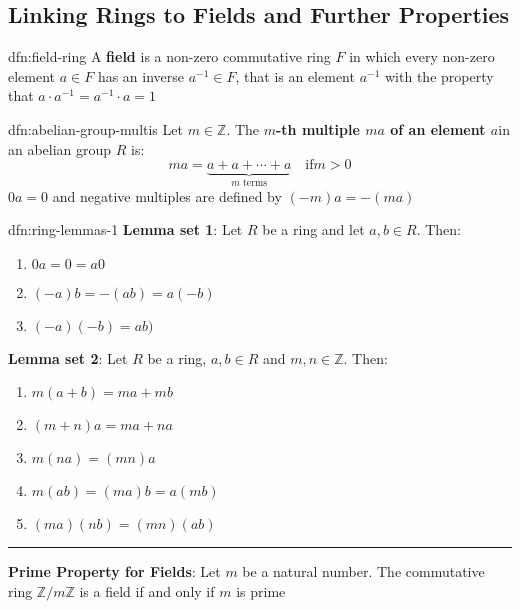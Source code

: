 \documentclass[landscape, 8pt]{extarticle}
\begin{document}
\begin{multicols}{3}
\subsection{Linking Rings to Fields and Further Properties}

\begin{dfn}{dfn:field-ring}{}
    A \textbf{field} is a non-zero commutative ring $F$ in which every non-zero element $a\in F$ has an inverse $a^{-1}\in F$, that is an element $a^{-1}$ with the property that $a \cdot a^{-1} = a^{-1} \cdot a = 1$
\end{dfn}



\begin{dfn}{dfn:abelian-group-multis}{}
    Let $m\in \mathbb{Z}$. The \textbf{$m$-th multiple $ma$ of an element $a$}in an abelian group $R$ is:
    \[ma = \underbrace{a + a + \cdots + a}_{\text{$m$ terms}} \quad \text{if} m > 0\]
    $0a = 0$ and negative multiples are defined by $(-m)a = -(ma)$
\end{dfn}

\newpage


\begin{thm}{dfn:ring-lemmas-1}{}
    \textbf{Lemma set 1}: Let $R$ be a ring and let $a,b\in R$. Then:
    \begin{enumerate}
        \setlength\itemsep{0em}
        \item $0a = 0 = a 0$
        \item $(-a)b = -(ab) = a(-b)$
        \item $(-a)(-b) = ab)$
    \end{enumerate}

    \textbf{Lemma set 2}: Let $R$ be a ring, $a,b\in R$ and $m,n\in \mathbb{Z}$. Then:
    \begin{enumerate}
        \setlength\itemsep{0em}
        \item $m(a + b) = ma + mb$
        \item $(m + n)a = ma + na$
        \item $m(na) = (mn)a$
        \item $m(ab) = (ma)b = a(mb)$
        \item $(ma)(nb) = (mn)(ab)$
    \end{enumerate}

    \vspace{-5pt}
    \noindent\rule{\textwidth}{0.2pt}
    \textbf{Prime Property for Fields}: Let $m$ be a natural number. The commutative ring $\mathbb{Z} / m\mathbb{Z}$ is a field if and only if $m$ is prime
\end{thm}


\end{multicols}
\end{document}
